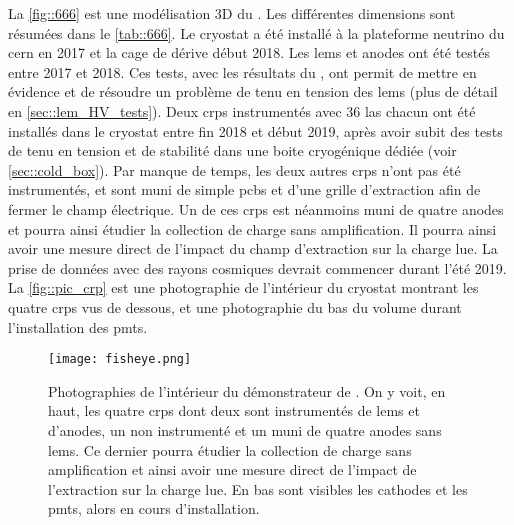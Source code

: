       La \autoref{fig::666} est une modélisation 3D du \SSS{}. Les différentes dimensions sont résumées dans le \autoref{tab::666}. Le cryostat a été installé à la plateforme neutrino du \gls{cern} en 2017 et la cage de dérive début 2018. Les \glspl{lem} et anodes ont été testés entre 2017 et 2018. Ces tests, avec les résultats du \TOO{}, ont permit de mettre en évidence et de résoudre un problème de tenu en tension des \glspl{lem} (plus de détail en \autoref{sec::lem_HV_tests}). Deux \glspl{crp} instrumentés avec 36 \gls{las} chacun ont été installés dans le cryostat entre fin 2018 et début 2019, après avoir subit des tests de tenu en tension et de stabilité dans une boite cryogénique dédiée (voir \autoref{sec::cold_box}). Par manque de temps, les deux autres \glspl{crp} n'ont pas été instrumentés, et sont muni de simple \glspl{pcb} et d'une grille d'extraction afin de fermer le champ électrique. Un de ces \glspl{crp} est néanmoins muni de quatre anodes et pourra ainsi étudier la collection de charge sans amplification. Il pourra ainsi avoir une mesure direct de l'impact du champ d'extraction sur la charge lue. La prise de données avec des rayons cosmiques devrait commencer durant l'été 2019. La \autoref{fig::pic_crp} est une photographie de l'intérieur du cryostat montrant les quatre \glspl{crp} vus de dessous, et une photographie du bas du volume durant l'installation des \glspl{pmt}.

      \begin{figure}[htbp]
        \begin{center}\texttt{[image: fisheye.png]}\end{center}
        \caption[Schéma du démonstrateur de \SSS{}.]{\label{fig::pic_crp}Photographies de l'intérieur du démonstrateur de \SSS{}. On y voit, en haut, les quatre \glspl{crp} dont deux sont instrumentés de \glspl{lem} et d'anodes, un non instrumenté et un muni de quatre anodes sans \glspl{lem}. Ce dernier pourra étudier la collection de charge sans amplification et ainsi avoir une mesure direct de l'impact de l'extraction sur la charge lue. En bas sont visibles les cathodes et les \glspl{pmt}, alors en cours d'installation.}
      \end{figure}

\FloatBarrier

\printbibliography